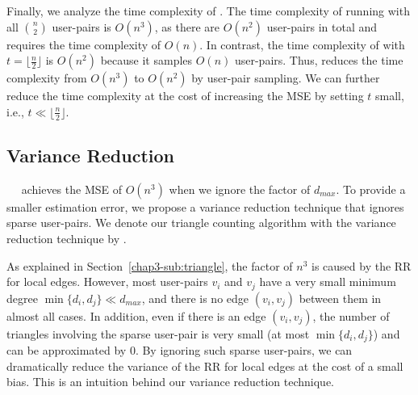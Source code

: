 Finally, we analyze the time complexity of \AlgWSTri{}.
The time complexity of running \AlgWSLE{} with all $\binom{n}{2}$ user-pairs is $O(n^3)$, as there are $O(n^2)$ user-pairs in total and \AlgWSLE{} requires the time complexity of $O(n)$.
In contrast, the time complexity of \AlgWSTri{} with $t = \lfloor \frac{n}{2} \rfloor$ is $O(n^2)$ because it samples $O(n)$ user-pairs.
Thus, \AlgWSTri{} reduces the time complexity from $O(n^3)$ to $O(n^2)$ by user-pair sampling.
We can further reduce the time complexity at the cost of increasing the MSE by setting $t$ small,
i.e., $t \ll \lfloor \frac{n}{2} \rfloor$.

\subsection{Variance Reduction}
\label{chap3-sub:var_red}
~~\AlgWSTri{}
achieves the MSE of $O(n^3)$ when we ignore the factor of $d_{max}$.
To provide a smaller estimation error,
we propose a variance reduction technique that ignores sparse user-pairs.
We denote our triangle counting algorithm with the variance reduction technique by \AlgWSTriVR{}.

As explained in Section~\ref{chap3-sub:triangle}, the factor of $n^3$ is caused by the RR for local edges.
However, most user-pairs $v_i$ and $v_j$ have a very small minimum degree
$\min\{d_i, d_j\} \ll d_{max}$,
and there is no edge $(v_i, v_j)$ between them in almost all cases.
In addition, even if there is an edge $(v_i, v_j)$, the number of triangles involving the sparse user-pair is very small
(at most $\min\{d_i, d_j\}$)
and can be approximated by $0$.
By ignoring such sparse user-pairs, we can dramatically reduce the variance of the RR for local edges at the cost of a small bias.
This is an intuition behind our variance reduction technique.

